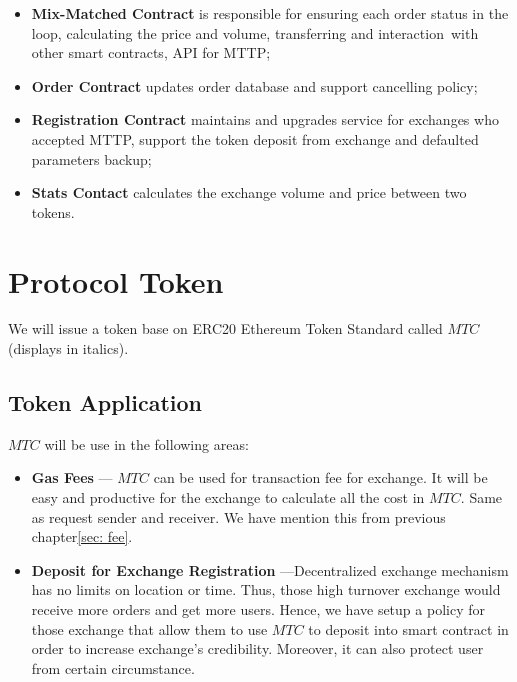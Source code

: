 \documentclass[UTF8,nofonts]{article}
\begin{document}
\begin{itemize}
 \item \textbf{Mix-Matched Contract} is responsible for ensuring each order status in the loop,  calculating the price and volume,  transferring and interaction with other smart contracts,  API for MTTP;
 \item  \textbf{Order Contract} updates order database and support cancelling policy;
 \item \textbf{Registration Contract} maintains and upgrades service for exchanges who accepted MTTP,  support the token deposit from exchange and defaulted parameters backup;
 \item \textbf{Stats Contact} calculates the exchange volume and price between two tokens.

\end{itemize}

\section{Protocol Token \label{sec: protocoltoken}}


We will issue a token base on ERC20 Ethereum Token Standard called $MTC$ (displays in italics).


\subsection{Token Application}

$MTC$ will be use in the following areas:

\begin{itemize}
 \item \textbf{Gas Fees} --- $MTC$ can be used for transaction fee for exchange. It will be easy and productive for the exchange to calculate all the cost in $MTC$. Same as request sender and receiver. We have mention this from previous chapter\ref{sec: fee}.
 \item \textbf{Deposit for Exchange Registration} ---Decentralized exchange mechanism has no limits on location or time. Thus,  those high turnover exchange would receive more orders and get more users. Hence,  we have setup a policy for those exchange that allow them to use $MTC$ to deposit into smart contract in order to increase exchange's credibility. Moreover,  it can also protect user from certain circumstance.
\end{itemize}
\end{document}
